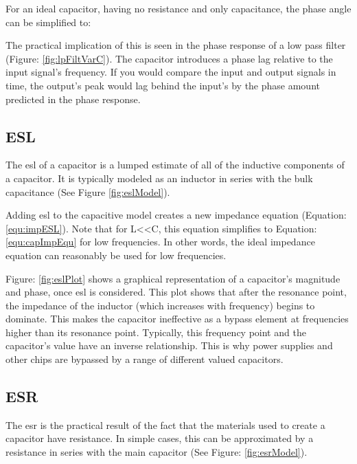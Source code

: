 
For an ideal capacitor, having no resistance and only capacitance, the phase angle can be simplified to:


The practical implication of this is seen in the phase response of a low pass filter (Figure: \ref{fig:lpFiltVarC}). The capacitor introduces a phase lag relative to the input signal's frequency. If you would compare the input and output signals in time, the output's peak would lag behind the input's by the phase amount predicted in the phase response.

\subsection{ESL}

The \gls{esl} of a capacitor is a lumped estimate of all of the inductive components of a capacitor. It is typically modeled as an inductor in series with the bulk capacitance (See Figure \ref{fig:eslModel}).



Adding \gls{esl} to the capacitive model creates a new impedance equation (Equation: \eqref{equ:impESL}). Note that for L\textless \textless C, this equation simplifies to Equation: \eqref{equ:capImpEqu} for low frequencies. In other words, the ideal impedance equation can reasonably be used for low frequencies.




Figure: \ref{fig:eslPlot} shows a graphical representation of a capacitor's magnitude and phase, once \gls{esl} is considered. This plot shows that after the resonance point, the impedance of the inductor (which increases with frequency) begins to dominate. This makes the capacitor ineffective as a bypass element at frequencies higher than its resonance point. Typically, this frequency point and the capacitor's value have an inverse relationship. This is why power supplies and other chips are bypassed by a range of different valued capacitors. 

\subsection{ESR}
\label{sec:ESR}

The \gls{esr} is the practical result of the fact that the materials used to create a capacitor have resistance. In simple cases, this can be approximated by a resistance in series with the main capacitor (See Figure: \ref{fig:esrModel}).

